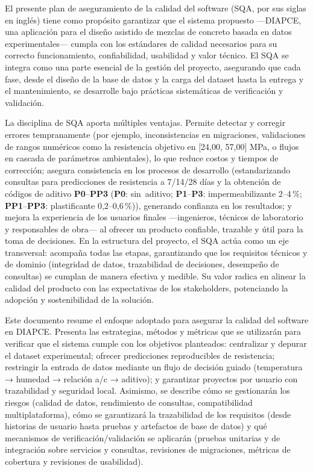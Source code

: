 
El presente plan de aseguramiento de la calidad del software (SQA, por sus siglas en inglés) tiene como propósito garantizar que el sistema propuesto —DIAPCE, una aplicación para el diseño asistido de mezclas de concreto basada en datos experimentales— cumpla con los estándares de calidad necesarios para su correcto funcionamiento, confiabilidad, usabilidad y valor técnico. El SQA se integra como una parte esencial de la gestión del proyecto, asegurando que cada fase, desde el diseño de la base de datos y la carga del dataset hasta la entrega y el mantenimiento, se desarrolle bajo prácticas sistemáticas de verificación y validación.

La disciplina de SQA aporta múltiples ventajas. Permite detectar y corregir errores tempranamente (por ejemplo, inconsistencias en migraciones, validaciones de rangos numéricos como la resistencia objetivo en [24{,}00, 57{,}00] MPa, o flujos en cascada de parámetros ambientales), lo que reduce costos y tiempos de corrección; asegura consistencia en los procesos de desarrollo (estandarizando consultas para predicciones de resistencia a 7/14/28 días y la obtención de códigos de aditivo \textbf{P0}--\textbf{PP3} (\textbf{P0}: sin~aditivo; \textbf{P1}--\textbf{P3}: impermeabilizante 2--4\,\%; \textbf{PP1}--\textbf{PP3}: plastificante 0{,}2--0{,}6\,\%)), generando confianza en los resultados; y mejora la experiencia de los usuarios finales —ingenieros, técnicos de laboratorio y responsables de obra— al ofrecer un producto confiable, trazable y útil para la toma de decisiones. En la estructura del proyecto, el SQA actúa como un eje transversal: acompaña todas las etapas, garantizando que los requisitos técnicos y de dominio (integridad de datos, trazabilidad de decisiones, desempeño de consultas) se cumplan de manera efectiva y medible. Su valor radica en alinear la calidad del producto con las expectativas de los stakeholders, potenciando la adopción y sostenibilidad de la solución.

Este documento resume el enfoque adoptado para asegurar la calidad del software en DIAPCE. Presenta las estrategias, métodos y métricas que se utilizarán para verificar que el sistema cumple con los objetivos planteados: centralizar y depurar el dataset experimental; ofrecer predicciones reproducibles de resistencia; restringir la entrada de datos mediante un flujo de decisión guiado (temperatura → humedad → relación a/c → aditivo); y garantizar proyectos por usuario con trazabilidad y seguridad local. Asimismo, se describe cómo se gestionarán los riesgos (calidad de datos, rendimiento de consultas, compatibilidad multiplataforma), cómo se garantizará la trazabilidad de los requisitos (desde historias de usuario hasta pruebas y artefactos de base de datos) y qué mecanismos de verificación/validación se aplicarán (pruebas unitarias y de integración sobre servicios y consultas, revisiones de migraciones, métricas de cobertura y revisiones de usabilidad).

